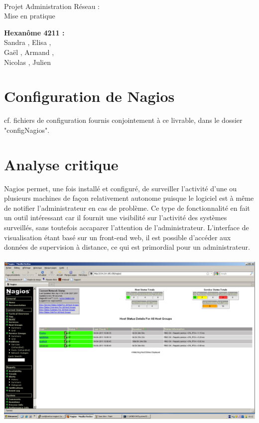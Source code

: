 \documentclass[a4paper]{article}
\begin{document}
\begin{titlepage}
	~ 
	\vfill
	\begin{center}
		\begin{Huge}
			Projet Administration Réseau : \\ Mise en pratique\\
		\end{Huge}
	\vfill
		\textbf{Hexanôme 4211 :} 
			\\Sandra {}, Elisa , 
			\\Gaël , Armand , 
			\\Nicolas {}, Julien \\
	\vfill
	\end{center}
	\vfill
\end{titlepage}


\section{Configuration de Nagios}

cf. fichiers de configuration fournis conjointement à ce livrable, dans le dossier "configNagios".

\section{Analyse critique}
Nagios permet, une fois installé et configuré, de surveiller l'activité d'une ou plusieurs machines de façon relativement autonome puisque le logiciel est à même de notifier l'administrateur en cas de problème. Ce type de fonctionnalité en fait un outil intéressant car il fournit une visibilité sur l'activité des systèmes surveillés, sans toutefois accaparer l'attention de l'administrateur. L'interface de visualisation étant basé sur un front-end web, il est possible d'accéder aux données de supervision à distance, ce qui est primordial pour un administrateur. ~\\

\includegraphics[width=\linewidth]{nagios-global.PNG}
\end{document}
